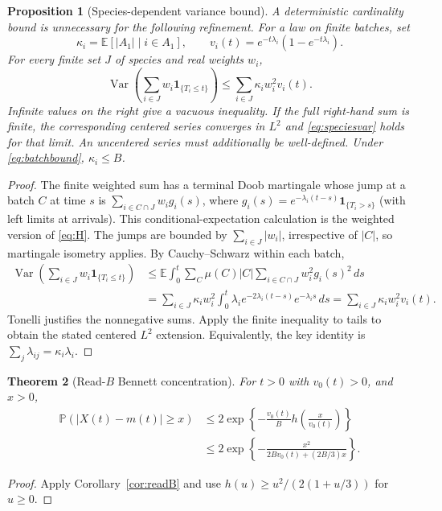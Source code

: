 \documentclass[11pt]{article}
\numberwithin{equation}{section}
\newtheorem{theorem}{Theorem}[section]
\newtheorem{proposition}[theorem]{Proposition}
\theoremstyle{definition}
\theoremstyle{remark}
\newcommand{\E}{\mathbb E}
\newcommand{\Pp}{\mathbb P}
\newcommand{\ind}{\mathbf 1}
\newcommand{\Var}{\operatorname{Var}}
\begin{document}
\begin{proposition}[Species-dependent variance bound]\label{prop:speciesvar}
A deterministic cardinality bound is unnecessary for the following refinement.
For a law on finite batches, set
\[
 \kappa_i=\E[|A_1|\mid i\in A_1],\qquad
 v_i(t)=e^{-t\lambda_i}(1-e^{-t\lambda_i}).
\]
For every finite set $J$ of species and real weights $w_i$,
\begin{equation}\label{eq:speciesvar}
 \Var\left(\sum_{i\in J}w_i\ind_{\{T_i\le t\}}\right)
 \le\sum_{i\in J}\kappa_iw_i^2v_i(t).
\end{equation}
Infinite values on the right give a vacuous inequality. If the full right-hand
sum is finite, the corresponding centered series converges in $L^2$ and
\eqref{eq:speciesvar} holds for that limit. An uncentered series must additionally
be well-defined. Under \eqref{eq:batchbound}, $\kappa_i\le B$.
\end{proposition}
\begin{proof}
The finite weighted sum has a terminal Doob martingale whose jump at a batch
$C$ at time $s$ is $\sum_{i\in C\cap J}w_i g_i(s)$, where
$g_i(s)=e^{-\lambda_i(t-s)}\ind_{\{T_i>s\}}$ (with left limits at arrivals).
This conditional-expectation calculation is the weighted version of
\eqref{eq:H}. The jumps are bounded by $\sum_{i\in J}|w_i|$, irrespective of
$|C|$, so martingale isometry applies. By Cauchy--Schwarz within each batch,
\begin{align*}
 \Var\left(\sum_{i\in J}w_i\ind_{\{T_i\le t\}}\right)
 &\le \E\int_0^t\sum_C\mu(C)|C|
            \sum_{i\in C\cap J}w_i^2g_i(s)^2\,ds\\
 &=\sum_{i\in J}\kappa_i w_i^2\int_0^t
       \lambda_i e^{-2\lambda_i(t-s)}e^{-\lambda_i s}\,ds
 =\sum_{i\in J}\kappa_iw_i^2v_i(t).
\end{align*}
Tonelli justifies the nonnegative sums. Apply the finite inequality to tails
to obtain the stated centered $L^2$ extension. Equivalently, the key identity
is $\sum_j\lambda_{ij}=\kappa_i\lambda_i$.
\end{proof}

\begin{theorem}[Read-$B$ Bennett concentration]\label{thm:bennett}
For $t>0$ with $v_0(t)>0$, and $x>0$,
\begin{align}
 \Pp(|X(t)-m(t)|\ge x)
 &\le2\exp\left\{-\frac{v_0(t)}B h\left(\frac{x}{v_0(t)}\right)\right\}
 \label{eq:discoverybennett}\\
 &\le2\exp\left\{-\frac{x^2}{2Bv_0(t)+(2B/3)x}\right\}.
 \label{eq:discoverybernstein}
\end{align}
\end{theorem}
\begin{proof}
Apply Corollary~\ref{cor:readB} and use
$h(u)\ge u^2/(2(1+u/3))$ for $u\ge0$.
\end{proof}
\end{document}
